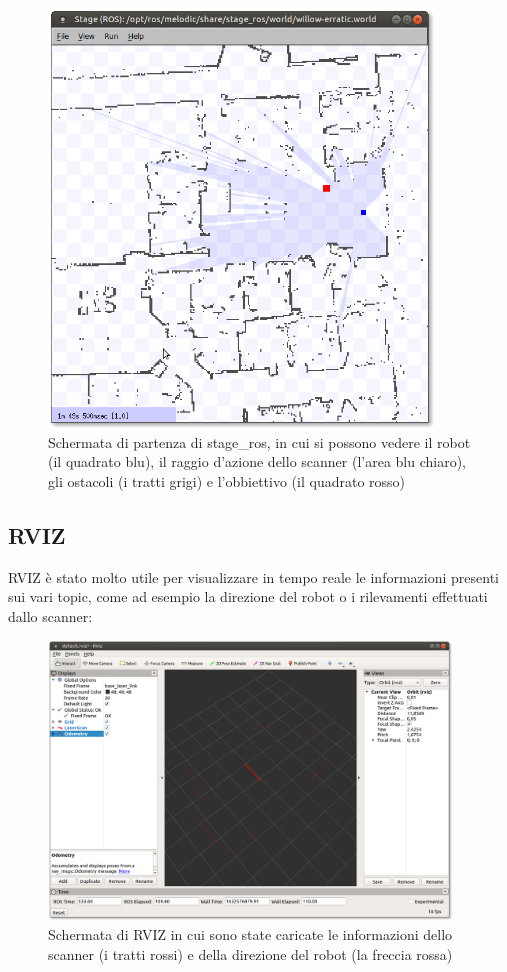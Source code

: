 \documentclass[Lau, binding=0.6cm, oneside]{sapthesis}
\begin{document}
\begin{figure}[htp]
    \centering
    \includegraphics[height=30em]{stage_ros.png}
    \caption{Schermata di partenza di stage\_ros, in cui si possono vedere il robot (il quadrato blu), il raggio d'azione dello scanner (l'area blu chiaro), gli ostacoli (i tratti grigi) e l'obbiettivo (il quadrato rosso)}
    \label{fig:stage_ros}
\end{figure}

\subsection{RVIZ}
RVIZ è stato molto utile per visualizzare in tempo reale le informazioni presenti sui vari topic, come ad esempio la direzione del robot o i rilevamenti effettuati dallo scanner:

\begin{figure}[htp]
    \centering
    \includegraphics[height=20em]{rviz.png}
    \caption{Schermata di RVIZ in cui sono state caricate le informazioni dello scanner (i tratti rossi) e della direzione del robot (la freccia rossa)}
    \label{fig:rviz}
\end{figure}
\end{document}
